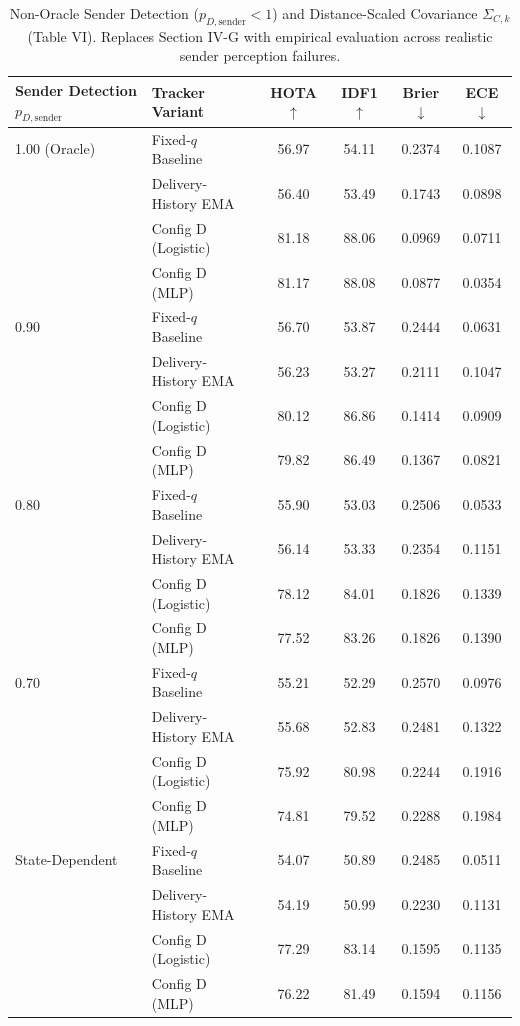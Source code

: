 \begin{table}[!t]
\caption{Non-Oracle Sender Detection ($p_{D,\text{sender}} < 1$) and Distance-Scaled Covariance $\Sigma_{C,k}$ (Table VI). Replaces Section IV-G with empirical evaluation across realistic sender perception failures.}
\label{tab:non_oracle_sender}
\centering
\small
\begin{tabular}{llcccc}
\toprule
Sender Detection $p_{D,\text{sender}}$ & Tracker Variant & HOTA $\uparrow$ & IDF1 $\uparrow$ & Brier $\downarrow$ & ECE $\downarrow$ \\
\midrule
1.00 (Oracle) & Fixed-$q$ Baseline & 56.97 & 54.11 & 0.2374 & 0.1087 \\
 & Delivery-History EMA & 56.40 & 53.49 & 0.1743 & 0.0898 \\
 & Config D (Logistic) & 81.18 & 88.06 & 0.0969 & 0.0711 \\
 & Config D (MLP) & 81.17 & 88.08 & 0.0877 & 0.0354 \\
\midrule
0.90 & Fixed-$q$ Baseline & 56.70 & 53.87 & 0.2444 & 0.0631 \\
 & Delivery-History EMA & 56.23 & 53.27 & 0.2111 & 0.1047 \\
 & Config D (Logistic) & 80.12 & 86.86 & 0.1414 & 0.0909 \\
 & Config D (MLP) & 79.82 & 86.49 & 0.1367 & 0.0821 \\
\midrule
0.80 & Fixed-$q$ Baseline & 55.90 & 53.03 & 0.2506 & 0.0533 \\
 & Delivery-History EMA & 56.14 & 53.33 & 0.2354 & 0.1151 \\
 & Config D (Logistic) & 78.12 & 84.01 & 0.1826 & 0.1339 \\
 & Config D (MLP) & 77.52 & 83.26 & 0.1826 & 0.1390 \\
\midrule
0.70 & Fixed-$q$ Baseline & 55.21 & 52.29 & 0.2570 & 0.0976 \\
 & Delivery-History EMA & 55.68 & 52.83 & 0.2481 & 0.1322 \\
 & Config D (Logistic) & 75.92 & 80.98 & 0.2244 & 0.1916 \\
 & Config D (MLP) & 74.81 & 79.52 & 0.2288 & 0.1984 \\
\midrule
State-Dependent & Fixed-$q$ Baseline & 54.07 & 50.89 & 0.2485 & 0.0511 \\
 & Delivery-History EMA & 54.19 & 50.99 & 0.2230 & 0.1131 \\
 & Config D (Logistic) & 77.29 & 83.14 & 0.1595 & 0.1135 \\
 & Config D (MLP) & 76.22 & 81.49 & 0.1594 & 0.1156 \\
\bottomrule
\end{tabular}
\end{table}
